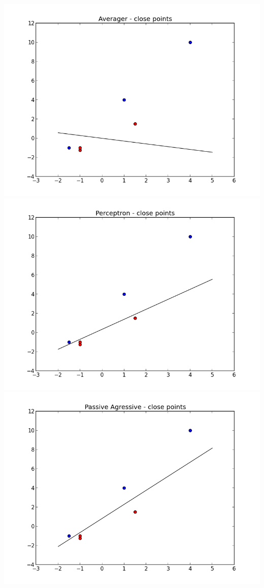 \documentclass{article}
\begin{document}
\begin{enumerate}
\includegraphics[width=\linewidth/3]{../Plots/AvgClo} \includegraphics[width=\linewidth/3]{../Plots/PerClo} \includegraphics[width=\linewidth/3]{../Plots/PaClo} \\


\end{enumerate}
\end{document}
